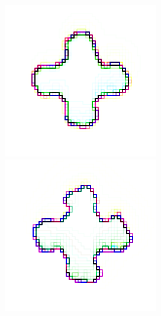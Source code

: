 \documentclass[12pt,a4paper]{article}
\begin{document}
\begin{figure}[H]
\begin{minipage}{.25\textwidth}
\end{minipage}%
\begin{minipage}{.25\textwidth}
  \centering
  \includegraphics[width=\linewidth]{Pictures/PlusTHINC.png}
\end{minipage}%
\begin{minipage}{.25\textwidth}
  \centering
  \includegraphics[width=\linewidth]{Pictures/PlusJR.png}
\end{minipage}
\end{figure}
\end{document}
